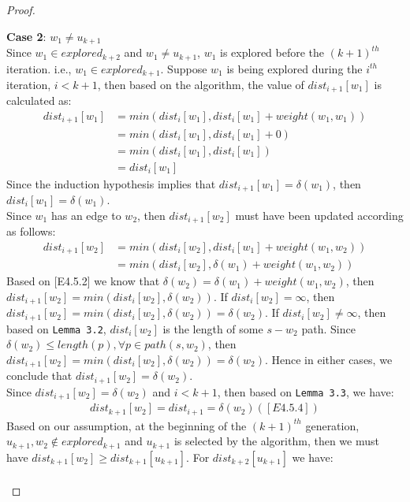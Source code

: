 \begin{proof}
\begin{itemize}
\begin{enumerate}
  \textbf{Case 2}: $w_1 \neq u_{k+1}$
  \\ 
  Since $w_1 \in explored_{k+2}$ and $w_1 \neq u_{k+1}$, $w_1$ is explored before the $(k+1)^{th}$ iteration. i.e., $w_1 \in explored_{k+1}$. Suppose $w_1$ is being explored during the $i^{th}$ iteration, $i < k+1$, then based on the algorithm, the value of $dist_{i+1}[w_1]$ is calculated as: 
  \begin{align*}
        dist_{i+1}[w_1] &= min(dist_{i}[w_1], dist_{i}[w_1] + weight(w_1,w_1)) \\
                        &= min(dist_{i}[w_1], dist_{i}[w_1] + 0)\\
                        &= min(dist_{i}[w_1], dist_{i}[w_1])\\
                        &= dist_{i}[w_1]
  \end{align*}
  Since the induction hypothesis implies that $dist_{i+1}[w_1] = \delta(w_1)$, then $dist_i[w_1] = \delta(w_1)$. 
  \\
  Since $w_1$ has an edge to $w_2$, then $dist_{i+1}[w_2]$ must have been updated according as follows: 
  \begin{align*}
     dist_{i+1}[w_2] &= min(dist_i[w_2], dist_i[w_1] + weight(w_1,w_2)) \\
                     &= min(dist_i[w_2], \delta(w_1) + weight(w_1, w_2))
  \end{align*}
  Based on [E4.5.2] we know that $\delta(w_2) =  \delta(w_1) + weight(w_1, w_2)$, then $dist_{i+1}[w_2] = min(dist_i[w_2], \delta(w_2))$. If $dist_i[w_2] = \infty$, then $dist_{i+1}[w_2] = min(dist_i[w_2], \delta(w_2)) = \delta(w_2)$. If $dist_i[w_2] \neq \infty$, then based on \texttt{Lemma 3.2}, $dist_i[w_2]$ is the length of some $s-w_2$ path. Since $\delta(w_2) \leq length(p), \forall p \in path(s, w_2)$, then $dist_{i+1}[w_2] = min(dist_i[w_2], \delta(w_2)) = \delta(w_2)$. Hence in either cases, we conclude that $dist_{i+1}[w_2] = \delta(w_2)$. 
  \\
  Since $dist_{i+1}[w_2] = \delta(w_2)$ and $i < k+1$, then based on \texttt{Lemma 3.3}, we have:
  \begin{align*}
  dist_{k+1}[w_2] = dist_{i+1} = \delta(w_2) ([E4.5.4])
  \end{align*}
  Based on our assumption, at the beginning of the $(k+1)^{th}$ generation, $u_{k+1}, w_2 \notin explored_{k+1}$ and $u_{k+1}$ is selected by the algorithm, then we must have $dist_{k+1}[w_2] \geq dist_{k+1}[u_{k+1}]$. For $dist_{k+2}[u_{k+1}]$ we have: 
  \begin{align*}

\end{align*}
\end{enumerate}
\end{itemize}
\end{proof}
